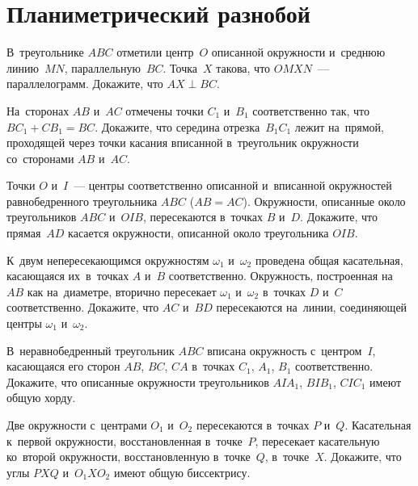 
\section*{Планиметрический разнобой}


\begin{problems}

\item
В~треугольнике $ABC$ отметили центр~$O$ описанной окружности
и~среднюю линию~$MN$, параллельную~$BC$.
Точка~$X$ такова, что $OMXN$~--- параллелограмм.
Докажите, что $AX \perp BC$.

\item
На~сторонах $AB$ и~$AC$ отмечены точки $C_1$ и~$B_1$ соответственно так, что
$B C_1 + C B_1 = BC$.
Докажите, что середина отрезка~$B_1 C_1$ лежит на~прямой, проходящей через
точки касания вписанной в~треугольник окружности со~сторонами $AB$ и~$AC$.

\item
Точки $O$ и~$I$~--- центры соответственно описанной и~вписанной окружностей
равнобедренного треугольника $ABC$ ($AB = AC$).
Окружности, описанные около треугольников $ABC$ и~$OIB$, пересекаются в~точках
$B$ и~$D$.
Докажите, что прямая~$AD$ касается окружности, описанной около
треугольника $OIB$.

\item
К~двум непересекающимся окружностям $\omega_1$ и~$\omega_2$ проведена общая
касательная, касающаяся их~в~точках $A$ и~$B$ соответственно.
Окружность, построенная на~$AB$ как на~диаметре, вторично пересекает $\omega_1$
и~$\omega_2$ в~точках $D$ и~$C$ соответственно.
Докажите, что $AC$ и~$BD$ пересекаются на~линии, соединяющей центры $\omega_1$
и~$\omega_2$.

\item
В~неравнобедренный треугольник $ABC$ вписана окружность с~центром~$I$,
касающаяся его сторон $AB$, $BC$, $CA$ в~точках $C_1$, $A_1$, $B_1$
соответственно.
Докажите, что описанные окружности треугольников
$A I A_1$, $B I B_1$, $C I C_1$ имеют общую хорду.

\item
Две окружности с~центрами $O_1$ и~$O_2$ пересекаются в~точках $P$ и~$Q$.
Касательная к~первой окружности, восстановленная в~точке~$P$, пересекает
касательную ко~второй окружности, восстановленную в~точке~$Q$, в~точке~$X$.
Докажите, что углы $PXQ$ и~$O_1 X O_2$ имеют общую биссектрису.


\end{problems}
